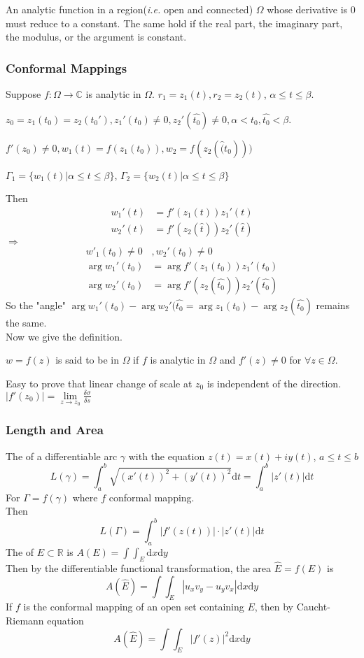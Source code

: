 \begin{theorem}
    An analytic function in a region(\textit{i.e.} open and connected) $ \Omega $ whose derivative is 0 must reduce to a constant. The same hold if the real part, the imaginary part, the modulus, or the argument is constant.
\end{theorem}
\subsubsection{Conformal Mappings}
Suppose  $ f:\Omega\rightarrow \mathbb{C}$ is analytic in  $ \Omega $.  $ r_1=z_1(t),r_2=z_2(t) $, $ \alpha \leq t \leq \beta $.

 $ z_0=z_1(t_0)=z_2(t_0') ,z_1'(t_0)\neq0,z_2'(\hat{t_0})\neq0,\alpha<t_0,\hat{t_0}<\beta$.
 
  $ f'(z_0)\neq0, w_1(t)=f(z_1(t_0)),w_2=f(z_2(\hat(t_0))) $
  
   $ \Gamma_1=\{w_1(t)|\alpha \leq t \leq \beta\} $,  $ \Gamma_2=\{w_2(t)|\alpha \leq t \leq \beta\}$        
   
Then 
\begin{align*}
    w_1'(t)&=f'(z_1(t))z_1'(t)\\
    w_2'(t)&=f'(z_2(\hat{t}))z_2'(\hat{t})
\end{align*}
 $ \Rightarrow  $
 \begin{align*}
    w'_1(t_0)\neq0&,w_2'(t_0)\neq0\\
    \arg w_1'(t_0)&=\arg f'(z_1(t_0))z_1'(t_0)\\
    \arg w_2'(t_0)&=\arg f'(z_2(\hat{t_0}))z_2'(\hat{t_0})
 \end{align*} 
So the "angle"  $ \arg w_1'(t_0)-\arg w_2'(\hat{t_0}=\arg z_1(t_0)-\arg z_2(\hat{t_0}) $ remains the same. \\
Now we give the definition.
\begin{definition}
     $ w=f(z) $ is said to be  in  $ \Omega $ if  $ f  $ is analytic in  $ \Omega  $ and  $ f'(z)\neq0 $ for  $ \forall z\in \Omega$.    
\end{definition}
Easy to prove that linear change of scale at  $ z_0 $  is independent of the direction.\\
\ie  $ |f'(z_0)|=\lim\limits_{z\to z_0}\frac{\delta \sigma}{\delta s} $ 
\subsubsection{Length and Area}
The  of a differentiable arc  $ \gamma $ with the equation  $ z(t)=x(t)+iy(t) $, $ a \leq t \leq b $
\[L(\gamma)=\int_{a }^{b }\sqrt{(x'(t))^2+(y'(t))^2}\mathrm{d}t=\int_{a }^{b }|z'(t)|\mathrm{d}t\]   
For  $ \Gamma=f(\gamma) $ where  $ f  $ conformal mapping.\\
Then 
\[L(\Gamma)=\int_{a}^{b}|f'(z(t))|\cdot|z'(t)|\mathrm{d}t\]
The  of  $ E\subset \mathbb{R} $ is  $ A(E)=\int \int_{E}\mathrm{d}x\mathrm{d}y $\\
Then by the differentiable functional transformation, the area $ \hat{E}=f(E) $ is 
\[A(\hat{E})=\int \int_E|u_xv_y-u_yv_x|\mathrm{d}x\mathrm{d}y\]  
If  $ f  $ is the conformal mapping of an open set containing  $ E  $, then by Caucht-Riemann equation
\[A(\hat{E})=\int\int_E|f'(z)|^2\mathrm{d}x\mathrm{d}y\]
